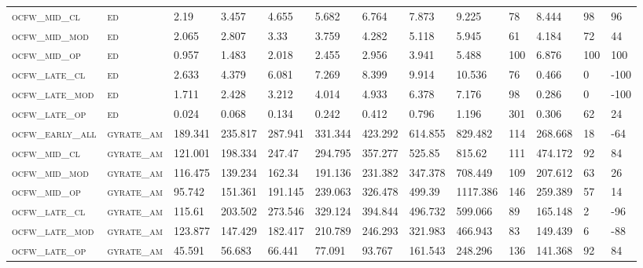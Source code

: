 \begin{landscape}
\begin{center}
\begin{footnotesize}
\begin{longtable}{lllllllllllll}
\textsc{ocfw\_mid\_cl   } & \textsc{ed        }   & 2.19     & 3.457    & 4.655    & 5.682    & 6.764    & 7.873    & 9.225    & 78  & 8.444    & 98  & 96   \\
\textsc{ocfw\_mid\_mod  } & \textsc{ed        }   & 2.065    & 2.807    & 3.33     & 3.759    & 4.282    & 5.118    & 5.945    & 61  & 4.184    & 72  & 44   \\
\textsc{ocfw\_mid\_op   } & \textsc{ed        }   & 0.957    & 1.483    & 2.018    & 2.455    & 2.956    & 3.941    & 5.488    & 100 & 6.876    & 100 & 100  \\
\textsc{ocfw\_late\_cl  } & \textsc{ed        }   & 2.633    & 4.379    & 6.081    & 7.269    & 8.399    & 9.914    & 10.536   & 76  & 0.466    & 0   & -100 \\
\textsc{ocfw\_late\_mod } & \textsc{ed        }   & 1.711    & 2.428    & 3.212    & 4.014    & 4.933    & 6.378    & 7.176    & 98  & 0.286    & 0   & -100 \\
\textsc{ocfw\_late\_op  } & \textsc{ed        }   & 0.024    & 0.068    & 0.134    & 0.242    & 0.412    & 0.796    & 1.196    & 301 & 0.306    & 62  & 24   \\
\textsc{ocfw\_early\_all} & \textsc{gyrate\_am}   & 189.341  & 235.817  & 287.941  & 331.344  & 423.292  & 614.855  & 829.482  & 114 & 268.668  & 18  & -64  \\
\textsc{ocfw\_mid\_cl   } & \textsc{gyrate\_am}   & 121.001  & 198.334  & 247.47   & 294.795  & 357.277  & 525.85   & 815.62   & 111 & 474.172  & 92  & 84   \\
\textsc{ocfw\_mid\_mod  } & \textsc{gyrate\_am}   & 116.475  & 139.234  & 162.34   & 191.136  & 231.382  & 347.378  & 708.449  & 109 & 207.612  & 63  & 26   \\
\textsc{ocfw\_mid\_op   } & \textsc{gyrate\_am}   & 95.742   & 151.361  & 191.145  & 239.063  & 326.478  & 499.39   & 1117.386 & 146 & 259.389  & 57  & 14   \\
\textsc{ocfw\_late\_cl  } & \textsc{gyrate\_am}   & 115.61   & 203.502  & 273.546  & 329.124  & 394.844  & 496.732  & 599.066  & 89  & 165.148  & 2   & -96  \\
\textsc{ocfw\_late\_mod } & \textsc{gyrate\_am}   & 123.877  & 147.429  & 182.417  & 210.789  & 246.293  & 321.983  & 466.943  & 83  & 149.439  & 6   & -88  \\
\textsc{ocfw\_late\_op  } & \textsc{gyrate\_am}   & 45.591   & 56.683   & 66.441   & 77.091   & 93.767   & 161.543  & 248.296  & 136 & 141.368  & 92  & 84   \\

\end{longtable}
\end{footnotesize}
\end{center}
\end{landscape}
